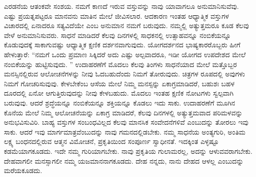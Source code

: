 ಎರಡನೆಯ ಆತಂಕವೇ ಸಂಶಯ. ನಮಗೆ ಕಾಣದೆ ಇರುವ ವಸ್ತುವನ್ನು ನಾವು ಯಾವಾಗಲೂ ಅನುಮಾನಿಸುವೆವು. ಎಷ್ಟು ಪ್ರಯತ್ನಪಟ್ಟರೂ ಮಾನವನು ಮಾತಿನ ಮೇಲೆ ಜೀವಿಸಲಾರ. ಆದಕಾರಣ ಇಂತಹ ಆಧ್ಯಾತ್ಮಿಕ ವಸ್ತುಗಳ ವಿಚಾರದಲ್ಲಿ ಏನಾದರೂ ಸತ್ಯವಿದೆಯೇ ಎಂಬ ಅನುಮಾನ ನಮಗೆ ಬರುವುದು. ನಮ್ಮಲ್ಲಿ ಅತ್ಯುತ್ತಮರೂ ಕೂಡ ಕೆಲವು ವೇಳೆ ಅನುಮಾನಿಸುವರು. ಸಾಧನೆ ಮಾಡಿದರೆ ಕೆಲವು ದಿನಗಳಲ್ಲಿ ಸಾಧಕನಲ್ಲಿ ಉತ್ಸಾಹವನ್ನೂ ನಂಬಿಕೆಯನ್ನೂ ಕೊಡುವುದಕ್ಕೆ ಸಾಕಾಗುವಷ್ಟು ಆಧ್ಯಾತ್ಮಿಕ ಕ್ಷಣಿಕ ದರ್ಶನವಾಗುವುದು. ಯೋಗದರ್ಶನದ ಭಾಷ್ಯಕಾರರೊಬ್ಬರು ಹೀಗೆ ಹೇಳುತ್ತಾರೆ: “ನಮಗೆ ಒಂದು ಪ್ರಮಾಣ ಸಿಕ್ಕಿದರೆ ಅದು ಎಷ್ಟು ಅಲ್ಪವಾದರೂ, ಇಡೀ ಯೋಗದ ಉಪದೇಶದ ಮೇಲೆ ನಂಬಿಕೆಯನ್ನು ಹುಟ್ಟಿಸುವುದು. ” ಉದಾಹರಣೆಗೆ ಮೊದಲು ಕೆಲವು ತಿಂಗಳು ಸಾಧನೆಯಾದ ಮೇಲೆ ಮತ್ತೊಬ್ಬರ ಮನಸ್ಸಿನಲ್ಲಿರುವ ಆಲೋಚನೆಗಳನ್ನು ನೀವು ಓದಬಹುದೆಂದು ನಿಮಗೆ ತೋರುವುದು. ಚಿತ್ರಗಳ ರೂಪದಲ್ಲಿ ಅವುಗಳು ನಿಮಗೆ ಗೋಚರಿಸುವುವು. ಕೇಳಬೇಕೆಂಬ ಆಸೆಯ ಮೇಲೆ ನಿಮ್ಮ ಮನಸ್ಸನ್ನು ಏಕಾಗ್ರಮಾಡಿದರೆ, ಬಹುಶಃ ಬಹಳ ದೂರದಲ್ಲಿ ಏನೋ ಆಗುತ್ತಿರುವುದನ್ನು ನೀವು ಕೇಳಬಹುದು. ಮೊದಲು ಇಂತಹ ಕ್ಷಣಿಕ ನೋಟಗಳು ಸ್ವಲ್ಪವಾಗಿ ಬರುವುವು. ಆದರೆ ಶ್ರದ್ಧೆಯನ್ನೂ ನಂಬಿಕೆಯನ್ನೂ ಶಕ್ತಿಯನ್ನೂ ಕೊಡಲು ಇದು ಸಾಕು. ಉದಾಹರಣೆಗೆ ಮೂಗಿನ ಕೊನೆಯ ಮೇಲೆ ನಿಮ್ಮ ಆಲೋಚನೆಯನ್ನು ಏಕಾಗ್ರ ಮಾಡಿದರೆ, ಕೆಲವು ದಿನಗಳಲ್ಲಿ ಅತ್ಯುತ್ತಮವಾದ ಪರಿಮಳವನ್ನು ಅನುಭವಿಸುವಿರಿ. ಬಾಹ್ಯ ವಸ್ತುಗಳ ಸಂಬಂಧವಿಲ್ಲದ ಕೆಲವು ಮಾನಸಿಕ ಸಂವೇದನೆಗಳಿವೆ ಎಂಬುದನ್ನು ತೋರಲು ಇವು ಸಾಕು. ಆದರೆ ಇವು ಮಾರ್ಗಮಾತ್ರವೆಂಬುದನ್ನು ನಾವು ಗಮನದಲ್ಲಿಡಬೇಕು. ನಮ್ಮ ಸಾಧನೆಯ ಅಂತ್ಯಗುರಿ, ಅಂತಿಮ ಲಕ್ಷ್ಯ ಬಂಧನದಲ್ಲಿರುವ ಆತ್ಮನ ವಿಮೋಚನೆ, ಪ್ರಕೃತಿಯಿಂದ ಸಂಪೂರ್ಣ ಸ್ವಾಧೀನತೆ. ಇದಕ್ಕಿಂತ ಎಳ್ಳಷ್ಟೂ ಕಡಮೆಯಾಗಕೂಡದು. ಇದೇ ನಮ್ಮ ಗುರಿಯಾಗಬೇಕು. ನಾವು ಪ್ರಕೃತಿಯ ಗುಲಾಮರಲ್ಲ, ಅದನ್ನು ಆಳುವವರಾಗಬೇಕು. ದೇಹವಾಗಲೀ ಮನಸ್ಸಾಗಲೀ ನಮ್ಮ ಯಜಮಾನನಾಗಕೂಡದು. ದೇಹ ನನ್ನದು, ನಾನು ದೇಹದ ಆಳಲ್ಲ ಎಂಬುದನ್ನು ಮರೆಯಕೂಡದು. 

\vskip 0.3cm

